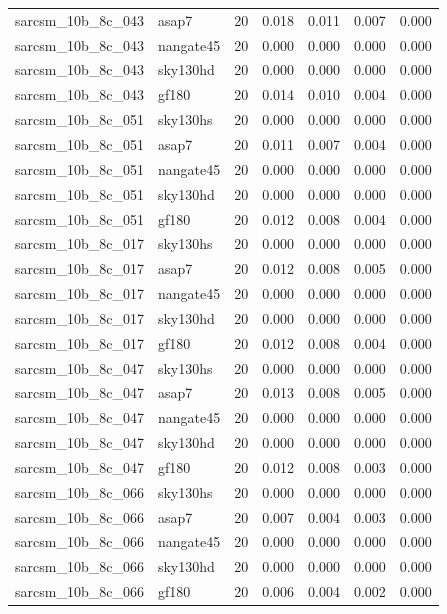 \begin{tabular}{llrrrrr}
sarcsm\_10b\_8c\_043 & asap7 & 20 & 0.018 & 0.011 & 0.007 & 0.000 \\
sarcsm\_10b\_8c\_043 & nangate45 & 20 & 0.000 & 0.000 & 0.000 & 0.000 \\
sarcsm\_10b\_8c\_043 & sky130hd & 20 & 0.000 & 0.000 & 0.000 & 0.000 \\
sarcsm\_10b\_8c\_043 & gf180 & 20 & 0.014 & 0.010 & 0.004 & 0.000 \\
sarcsm\_10b\_8c\_051 & sky130hs & 20 & 0.000 & 0.000 & 0.000 & 0.000 \\
sarcsm\_10b\_8c\_051 & asap7 & 20 & 0.011 & 0.007 & 0.004 & 0.000 \\
sarcsm\_10b\_8c\_051 & nangate45 & 20 & 0.000 & 0.000 & 0.000 & 0.000 \\
sarcsm\_10b\_8c\_051 & sky130hd & 20 & 0.000 & 0.000 & 0.000 & 0.000 \\
sarcsm\_10b\_8c\_051 & gf180 & 20 & 0.012 & 0.008 & 0.004 & 0.000 \\
sarcsm\_10b\_8c\_017 & sky130hs & 20 & 0.000 & 0.000 & 0.000 & 0.000 \\
sarcsm\_10b\_8c\_017 & asap7 & 20 & 0.012 & 0.008 & 0.005 & 0.000 \\
sarcsm\_10b\_8c\_017 & nangate45 & 20 & 0.000 & 0.000 & 0.000 & 0.000 \\
sarcsm\_10b\_8c\_017 & sky130hd & 20 & 0.000 & 0.000 & 0.000 & 0.000 \\
sarcsm\_10b\_8c\_017 & gf180 & 20 & 0.012 & 0.008 & 0.004 & 0.000 \\
sarcsm\_10b\_8c\_047 & sky130hs & 20 & 0.000 & 0.000 & 0.000 & 0.000 \\
sarcsm\_10b\_8c\_047 & asap7 & 20 & 0.013 & 0.008 & 0.005 & 0.000 \\
sarcsm\_10b\_8c\_047 & nangate45 & 20 & 0.000 & 0.000 & 0.000 & 0.000 \\
sarcsm\_10b\_8c\_047 & sky130hd & 20 & 0.000 & 0.000 & 0.000 & 0.000 \\
sarcsm\_10b\_8c\_047 & gf180 & 20 & 0.012 & 0.008 & 0.003 & 0.000 \\
sarcsm\_10b\_8c\_066 & sky130hs & 20 & 0.000 & 0.000 & 0.000 & 0.000 \\
sarcsm\_10b\_8c\_066 & asap7 & 20 & 0.007 & 0.004 & 0.003 & 0.000 \\
sarcsm\_10b\_8c\_066 & nangate45 & 20 & 0.000 & 0.000 & 0.000 & 0.000 \\
sarcsm\_10b\_8c\_066 & sky130hd & 20 & 0.000 & 0.000 & 0.000 & 0.000 \\
sarcsm\_10b\_8c\_066 & gf180 & 20 & 0.006 & 0.004 & 0.002 & 0.000 \\

\end{tabular}
